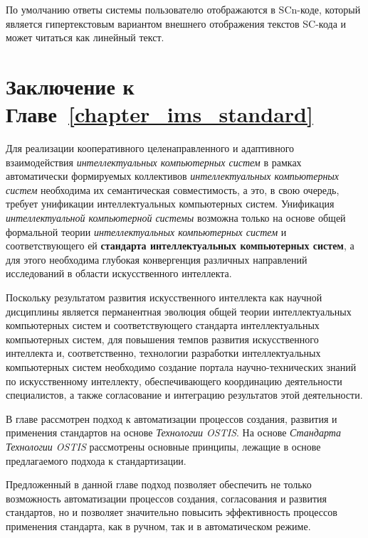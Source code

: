 По умолчанию ответы системы пользователю отображаются в SCn-коде, который является гипертекстовым вариантом внешнего отображения текстов SC-кода и может читаться как линейный текст.

\section*{Заключение к Главе~\ref{chapter_ims_standard}}

Для реализации кооперативного целенаправленного и адаптивного взаимодействия \textit{интеллектуальных компьютерных систем} в рамках автоматически формируемых коллективов \textit{интеллектуальных компьютерных систем} необходима их семантическая совместимость, а это, в свою очередь, требует унификации интеллектуальных компьютерных систем. Унификация \textit{интеллектуальной компьютерной системы} возможна только на основе общей формальной теории \textit{интеллектуальных компьютерных систем} и соответствующего ей \textbf{стандарта интеллектуальных компьютерных систем}, а для этого необходима глубокая конвергенция различных направлений исследований в области искусственного интеллекта.

Поскольку результатом развития искусственного интеллекта как научной дисциплины является перманентная эволюция общей теории интеллектуальных компьютерных систем и соответствующего стандарта интеллектуальных компьютерных систем, для повышения темпов развития искусственного интеллекта и, соответственно, технологии разработки интеллектуальных компьютерных систем необходимо создание портала научно-технических знаний по искусственному интеллекту, обеспечивающего координацию деятельности специалистов, а также согласование и интеграцию результатов этой деятельности.

В главе рассмотрен подход к автоматизации процессов создания, развития и применения стандартов на основе \textit{Технологии OSTIS}. На основе \textit{Стандарта Технологии OSTIS} рассмотрены основные принципы, лежащие в основе предлагаемого подхода к стандартизации.

Предложенный в данной главе подход позволяет обеспечить не только возможность автоматизации процессов создания, согласования и развития стандартов, но и позволяет значительно повысить эффективность процессов применения стандарта, как в ручном, так и в автоматическом режиме.

%
